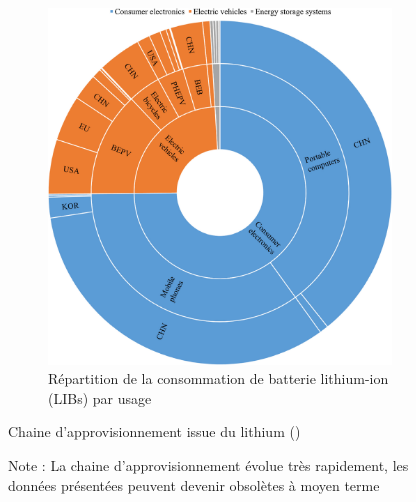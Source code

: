 \begin{figure}[!b]
\begin{subfigure}{0.4\textwidth}
    \includegraphics[width=\textwidth]{Images/supply_chain/1-s2.0-S0921344917301118-gr7_lrg.jpg}
    \caption{Répartition de la consommation de batterie lithium-ion (LIBs) par usage}
    \label{fig:LIB_use}
\end{subfigure}
        
\caption{Chaine d'approvisionnement issue du lithium (\cite{sun_tracing_2017})\\}
\caption*{Note : La chaine d'approvisionnement évolue très rapidement, les données présentées peuvent devenir obsolètes à moyen terme}
\label{fig:lithium_supply_chain}
\end{figure}

